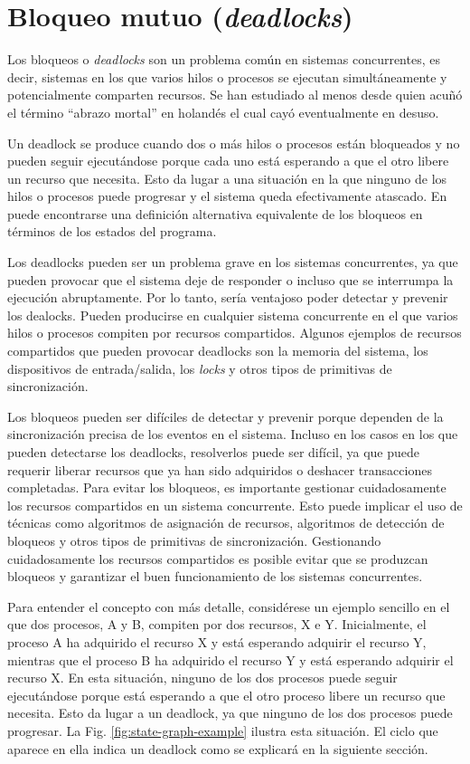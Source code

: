 \section{Bloqueo mutuo (\textit{deadlocks})}

Los bloqueos o \textit{deadlocks} son un problema común en sistemas concurrentes, es decir, sistemas
en los que varios hilos o procesos se ejecutan simultáneamente y potencialmente comparten
recursos. Se han estudiado al menos desde \cite{dijkstra1964}
quien acuñó el término ``abrazo mortal'' en holandés el cual cayó eventualmente en desuso.

Un deadlock se produce cuando dos o más hilos o procesos están bloqueados y no pueden seguir
ejecutándose porque cada uno está esperando a que el otro libere un recurso que necesita.
Esto da lugar a una situación en la que ninguno de los hilos o procesos puede progresar y el sistema
queda efectivamente atascado. En \cite{holt1972some} puede encontrarse una definición alternativa
equivalente de los bloqueos en términos de los estados del programa.

Los deadlocks pueden ser un problema grave en los sistemas concurrentes, ya que
pueden provocar que el sistema deje de responder o incluso que se interrumpa la ejecución abruptamente.
Por lo tanto, sería ventajoso poder detectar y prevenir los dealocks.
Pueden producirse en cualquier sistema concurrente
en el que varios hilos o procesos compiten por recursos compartidos.
Algunos ejemplos de recursos compartidos que pueden provocar deadlocks son la memoria del
sistema, los dispositivos de entrada/salida, los \textit{locks} y otros tipos de primitivas de
sincronización.

Los bloqueos pueden ser difíciles de detectar y prevenir
porque dependen de la sincronización precisa de los eventos en el sistema.
Incluso en los casos en los que pueden detectarse
los deadlocks, resolverlos puede ser difícil, ya que puede requerir liberar recursos que
ya han sido adquiridos o deshacer transacciones completadas.
Para evitar los bloqueos, es importante gestionar cuidadosamente
los recursos compartidos en un sistema concurrente.
Esto puede implicar el uso de técnicas como algoritmos de asignación de recursos,
algoritmos de detección de bloqueos y otros tipos de primitivas de sincronización.
Gestionando cuidadosamente los recursos compartidos
es posible evitar que se produzcan bloqueos y
garantizar el buen funcionamiento de los sistemas concurrentes.

Para entender el concepto con más detalle,
considérese un ejemplo sencillo en el que dos
procesos, A y B, compiten por dos recursos, X e Y.
Inicialmente, el proceso A ha adquirido el
recurso X y está esperando adquirir el recurso Y,
mientras que el proceso B ha adquirido el
recurso Y y está esperando adquirir el recurso X.
En esta situación, ninguno de los dos procesos puede seguir ejecutándose
porque está esperando a que el otro proceso libere un
recurso que necesita.
Esto da lugar a un deadlock, ya que ninguno de los dos procesos
puede progresar.
La Fig. \ref{fig:state-graph-example} ilustra esta situación.
El ciclo que aparece en ella indica un deadlock
como se explicará en la siguiente sección.

